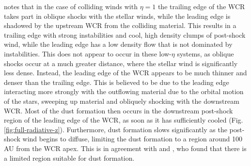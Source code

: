 \documentclass[fleqn,usenatbib]{mnras}
\begin{document}
\cite{pittard_3d_2009} notes that in the case of colliding winds with $\eta = 1$ the trailing edge of the WCR takes part in oblique shocks with the stellar winds, while the leading edge is shadowed by the upstream WCR from the colliding material.
This results in a trailing edge with strong instabilities and cool, high density clumps of post-shock wind, while the leading edge has a low density flow that is not dominated by instabilities.
This does not appear to occur in these low-$\eta$ systems, as oblique shocks occur at a much greater distance, where the stellar wind is significantly less dense.
Instead, the leading edge of the WCR appears to be much thinner and denser than the trailing edge.
This is believed to be due to the leading edge interacting more strongly with the outflowing material due to the orbital motion of the stars, sweeping up material and obliquely shocking with the downstream WCR. %
Most of the dust formation then occurs in the downstream post-shock region of the leading edge of the WCR, as soon as it has sufficiently cooled (Fig. \ref{fig:full-radiative-z}).
Furthermore, dust formation slows significantly as the post-shock wind begins to diffuse, limiting the dust formation to a region around 100 AU from the WCR apex. %
This is in agreement with \cite{williams_dust_1990} and \cite{hendrix_pinwheels_2016}, who found that there is a limited region suitable for dust formation.
\end{document}
